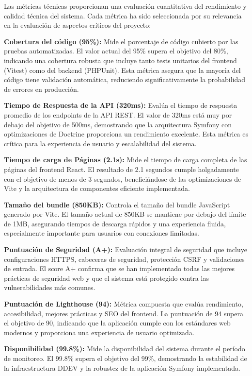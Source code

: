 \documentclass[12pt,a4paper,oneside]{report}
\begin{document}
Las métricas técnicas proporcionan una evaluación cuantitativa del rendimiento y calidad técnica del sistema. Cada métrica ha sido seleccionada por su relevancia en la evaluación de aspectos críticos del proyecto:

\textbf{Cobertura del código (95\%):} Mide el porcentaje de código cubierto por las pruebas automatizadas. El valor actual del 95\% supera el objetivo del 80\%, indicando una cobertura robusta que incluye tanto tests unitarios del frontend (Vitest) como del backend (PHPUnit). Esta métrica asegura que la mayoría del código tiene validación automática, reduciendo significativamente la probabilidad de errores en producción.

\textbf{Tiempo de Respuesta de la API (320ms):} Evalúa el tiempo de respuesta promedio de los endpoints de la API REST. El valor de 320ms está muy por debajo del objetivo de 500ms, demostrando que la arquitectura Symfony con optimizaciones de Doctrine proporciona un rendimiento excelente. Esta métrica es crítica para la experiencia de usuario y escalabilidad del sistema.

\textbf{Tiempo de carga de Páginas (2.1s):} Mide el tiempo de carga completa de las páginas del frontend React. El resultado de 2.1 segundos cumple holgadamente con el objetivo de menos de 3 segundos, beneficiándose de las optimizaciones de Vite y la arquitectura de componentes eficiente implementada.

\textbf{Tamaño del bundle (850KB):} Controla el tamaño del bundle JavaScript generado por Vite. El tamaño actual de 850KB se mantiene por debajo del límite de 1MB, asegurando tiempos de descarga rápidos y una experiencia fluida, especialmente importante para usuarios con conexiones limitadas.

\textbf{Puntuación de Seguridad (A+):} Evaluación integral de seguridad que incluye configuraciones HTTPS, cabeceras de seguridad, protección CSRF y validaciones de entrada. El score A+ confirma que se han implementado todas las mejores prácticas de seguridad web y que el sistema está protegido contra las vulnerabilidades más comunes.

\textbf{Puntuación de Lighthouse (94):} Métrica compuesta que evalúa rendimiento, accesibilidad, mejores prácticas y SEO del frontend. La puntuación de 94 supera el objetivo de 90, indicando que la aplicación cumple con los estándares web modernos y proporciona una experiencia de usuario optimizada.

\textbf{Disponibilidad (99.8\%):} Mide la disponibilidad del sistema durante el período de monitoreo. El 99.8\% supera el objetivo del 99\%, demostrando la estabilidad de la infraestructura DDEV y la robustez de la aplicación Symfony implementada.
\end{document}
